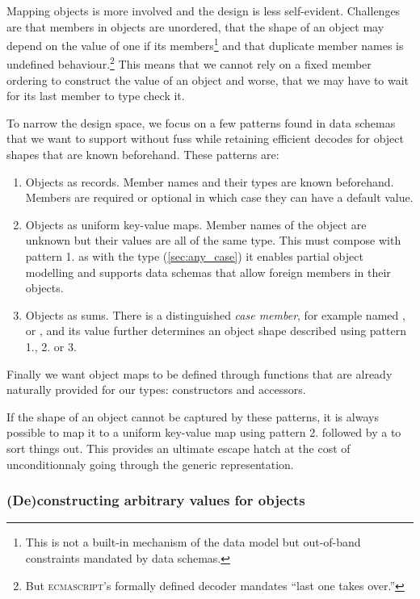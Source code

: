 \documentclass[nolinenum]{jfp}
\begin{document}
Mapping objects is more involved and the design is less
self-evident. Challenges are that members in \json{} objects are
unordered, that the shape of an object may depend on the value of one
if its members\footnote{This is not a built-in mechanism of the data
model but out-of-band constraints mandated by data schemas.} and that
duplicate member names is undefined behaviour.\footnote{But
\textsc{ecmascript}'s formally defined decoder
\mbox{} \citep{ecmascript} mandates ``last one takes
over.''} This means that we cannot rely on a fixed member ordering to
construct the \ml{} value of an object and worse, that we may have to
wait for its last member to type check it.

To narrow the design space, we focus on a few patterns found in
\json{} data schemas that we want to support without fuss while
retaining efficient decodes for object shapes that are known beforehand.
These patterns are:
%
\begin{enumerate}
\item Objects as records. Member names and their types are
  known beforehand. Members are required or optional in which
  case they can have a default value.
\item Objects as uniform key-value maps. Member names of the object
  are unknown but their values are all of the same type.  This
  must compose with pattern 1. as with the \json{} type 
  (\autoref{sec:any_case})
  it enables partial object modelling
  and supports data schemas that allow foreign members in their
  objects.
\item Objects as sums. There is a distinguished \emph{case member},
  for example named ,  or ,
  and its value further determines an object shape described using
  pattern 1., 2. or 3.
\end{enumerate}
%
Finally we want \json{} object maps to be defined through functions that are
already naturally provided for our \ml{} types: constructors and
accessors.

If the shape of an object cannot be captured by these patterns, it is
always possible to map it to a uniform  key-value map using
pattern 2. followed by a  to sort things out. This provides
an ultimate escape hatch at the cost of unconditionnaly going through
the generic representation.

\subsubsection{(De)constructing arbitrary \ml{} values for \json{} objects}
\end{document}
